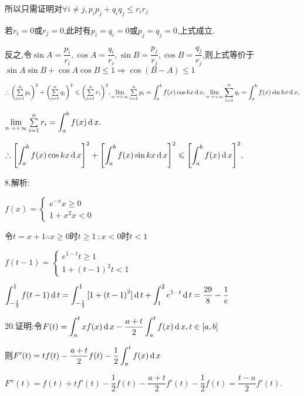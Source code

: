 所以只需证明对$\forall i \ne j,{p_i}{p_j} + {q_i}{q_j} \le {r_i}{r_j}$

若${r_i} = 0$或${r_j} = 0$,此时有${p_i} = {q_i} = 0$或${p_j} = {q_j} = 0$,上式成立.

反之,令$\sin A = \dfrac{{{p_i}}}{{{r_i}}},\cos A = \dfrac{{{q_i}}}{{{r_i}}},\sin B = \dfrac{{{p_j}}}{{{r_j}}},\cos B = \dfrac{{{q_j}}}{{{r_j}}}$,则上式等价于$\sin A\sin B + \cos A\cos B \le 1 \Rightarrow \cos (B - A) \le 1$

$\therefore {\left( {\sum\limits_{i = 1}^n {{p_i}} } \right)^2} + {\left( {\sum\limits_{i = 1}^n {{q_i}} } \right)^2} \leqslant {\left( {\sum\limits_{i = 1}^n {{r_i}} } \right)^2},\lim\limits_{n \to +\infty} \sum\limits_{i = 1}^n {{p_i}}  = \displaystyle\int_a^b {f(x)\cos kx\operatorname{\mathop{}\!\mathrm{d}} x} ,\lim\limits_{n \to +\infty} \sum\limits_{i = 1}^n {{q_i}}  = \displaystyle\int_a^b {f(x)\sin kx\operatorname{\mathop{}\!\mathrm{d}} x} ,$

$\lim\limits_{n \to +\infty} \sum\limits_{i = 1}^n {{r_i}}  = \displaystyle\int_a^b {f(x)\operatorname{\mathop{}\!\mathrm{d}} x} .$

$\therefore {\left[ {\displaystyle\int_a^b {f(x)\cos kx\operatorname{\mathop{}\!\mathrm{d}}x} } \right]^2} + {\left[ {\displaystyle\int_a^b {f(x)\sin kx\operatorname{\mathop{}\!\mathrm{d}} x} } \right]^2} \leqslant {\left[ {\displaystyle\int_a^b {f(x)\operatorname{\mathop{}\!\mathrm{d}}x} } \right]^2}.$

8.解析:

$f(x) = \left\{ \begin{array}{l}
{e^{ - x}} x \ge 0\\
1 + {x^2} x < 0
\end{array} \right.$

令$t = x + 1$$\therefore x \ge 0$时$t \ge 1\ ;$$x < 0 $时$t < 1$

$f(t - 1) = \left\{ \begin{array}{l}
{e^{1 - t}} t \ge 1\\
1 + {(t - 1)^2} t < 1
\end{array} \right.$

$\displaystyle\int_{ - \frac{1}{2}}^1 {f(t - 1)\operatorname{\mathop{}\!\mathrm{d}} t}  = \displaystyle\int_{ - \frac{1}{2}}^1 {[1 + {{(t - 1)}^2}]\operatorname{\mathop{}\!\mathrm{d}} t}  + \displaystyle\int_1^2 {{e^{1 - t}}} \operatorname{\mathop{}\!\mathrm{d}} t = \dfrac{{29}}{8} - \dfrac{1}{e}$

20.证明:令$F(t) = \displaystyle\int_a^t {xf(x)\operatorname{\mathop{}\!\mathrm{d}} x}  - \dfrac{{a + t}}{2}\displaystyle\int_a^t {f(x)\operatorname{\mathop{}\!\mathrm{d}} x} ,t \in [a,b]$

则$F'(t) = tf(t) - \dfrac{{a + t}}{2}f(t) - \dfrac{1}{2}\displaystyle\int_a^t {f(x)\operatorname{\mathop{}\!\mathrm{d}} x} $

$F''(t) = f(t) + tf'(t) - \dfrac{1}{2}f(t) - \dfrac{{a + t}}{2}f'(t) - \dfrac{1}{2}f(t) = \dfrac{{t - a}}{2}f'(t).$

